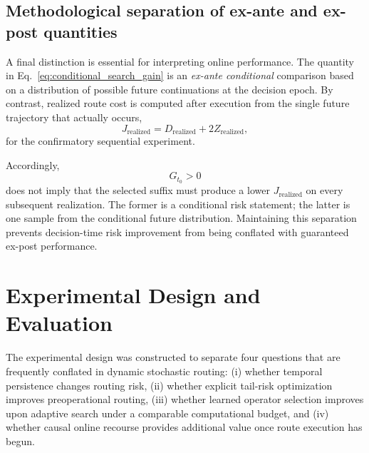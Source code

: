 \documentclass[preprint,12pt]{elsarticle}
\newcommand{\1}{\mathbf{1}}
\begin{document}
\subsection{Methodological separation of ex-ante and ex-post quantities}
\label{subsec:exante_expost}

A final distinction is essential for interpreting online performance.
The quantity in Eq.~\eqref{eq:conditional_search_gain} is an
\emph{ex-ante conditional} comparison based on a distribution of possible
future continuations at the decision epoch. By contrast, realized route cost is
computed after execution from the single future trajectory that actually occurs,
\begin{equation}
	J_{\mathrm{realized}}
	=
	D_{\mathrm{realized}}
	+
	2Z_{\mathrm{realized}},
	\label{eq:realized_objective}
\end{equation}
for the confirmatory sequential experiment.

Accordingly,
\[
G_{t_0}>0
\]
does not imply that the selected suffix must produce a lower
$J_{\mathrm{realized}}$ on every subsequent realization.
The former is a conditional risk statement; the latter is one sample from the
conditional future distribution. Maintaining this separation prevents
decision-time risk improvement from being conflated with guaranteed ex-post
performance.















\section{Experimental Design and Evaluation}
\label{sec:experiments}

The experimental design was constructed to separate four questions that are
frequently conflated in dynamic stochastic routing:
(i) whether temporal persistence changes routing risk,
(ii) whether explicit tail-risk optimization improves preoperational routing,
(iii) whether learned operator selection improves upon adaptive search under a
comparable computational budget, and
(iv) whether causal online recourse provides additional value once route
execution has begun.
\end{document}
